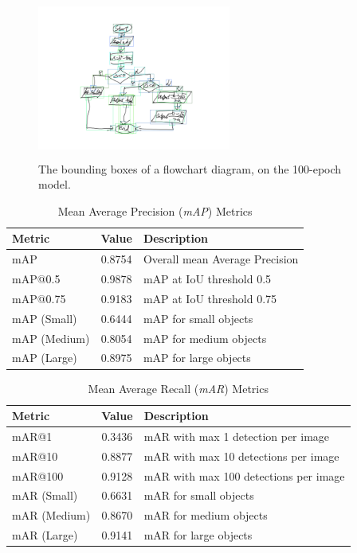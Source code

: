 \documentclass[conference]{IEEEtran}
\begin{document}
\begin{figure}[H]
	\centering
	\includegraphics[width=180pt, height=150pt]{fc.png}
	\caption{The bounding boxes of a flowchart diagram, on the 100-epoch model.}
	\label{fig:fc}
\end{figure}

\begin{table}[htbp]
	\centering
	\caption{Mean Average Precision (\textit{mAP}) Metrics}
	\begin{tabular}{|l|c|l|}
		\hline
		\textbf{Metric} & \textbf{Value} & \textbf{Description} \\
		\hline
		mAP & 0.8754 & Overall mean Average Precision \\
		mAP@0.5 & 0.9878 & mAP at IoU threshold 0.5 \\
		mAP@0.75 & 0.9183 & mAP at IoU threshold 0.75 \\
		\hline
		mAP (Small) & 0.6444 & mAP for small objects \\
		mAP (Medium) & 0.8054 & mAP for medium objects \\
		mAP (Large) & 0.8975 & mAP for large objects \\
		\hline
	\end{tabular}
	\label{tab:map}
\end{table}

\begin{table}[htbp]
	\centering
	\caption{Mean Average Recall (\textit{mAR}) Metrics}
	\label{tab:mar}
	\begin{tabular}{|l|c|l|}
		\hline
		\textbf{Metric} & \textbf{Value} & \textbf{Description} \\
		\hline
		mAR@1 & 0.3436 & mAR with max 1 detection per image \\
		mAR@10 & 0.8877 & mAR with max 10 detections per image \\
		mAR@100 & 0.9128 & mAR with max 100 detections per image \\
		\hline
		mAR (Small) & 0.6631 & mAR for small objects \\
		mAR (Medium) & 0.8670 & mAR for medium objects \\
		mAR (Large) & 0.9141 & mAR for large objects \\
		\hline
	\end{tabular}
\end{table}
\end{document}
